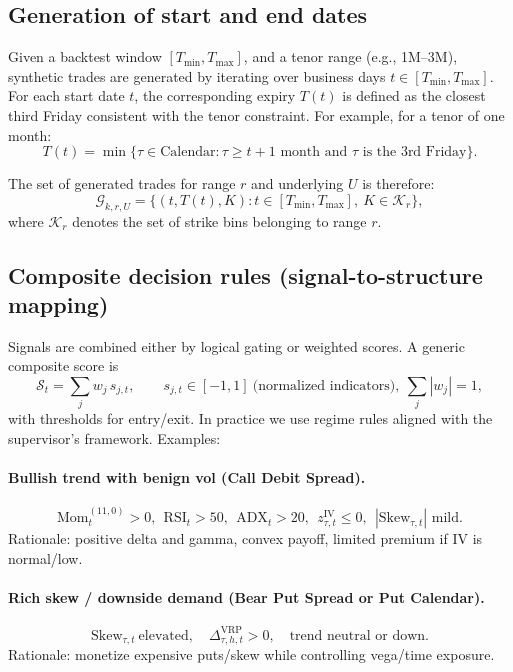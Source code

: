 \documentclass[12pt,a4paper]{report}
\begin{document}
\subsection{Generation of start and end dates}

Given a backtest window \([T_{\min}, T_{\max}]\), and a tenor range (e.g., 1M–3M), synthetic trades are generated by iterating over business days \(t \in [T_{\min}, T_{\max}]\). For each start date \(t\), the corresponding expiry \(T(t)\) is defined as the closest third Friday consistent with the tenor constraint. For example, for a tenor of one month:
\[
    T(t) = \min \{ \tau \in \text{Calendar} : \tau \geq t + 1 \text{ month and } \tau \text{ is the 3rd Friday} \}.
\]

The set of generated trades for range \(r\) and underlying \(U\) is therefore:
\[
    \mathcal{G}_{k,r,U} = \{ (t, T(t), K) : t \in [T_{\min}, T_{\max}], \ K \in \mathcal{K}_{r} \},
\]
where \(\mathcal{K}_{r}\) denotes the set of strike bins belonging to range \(r\).


\subsection{Composite decision rules (signal-to-structure mapping)}
Signals are combined either by logical gating or weighted scores. A generic composite score is
\[
\mathcal{S}_t=\sum_{j} w_j\, s_{j,t},\qquad s_{j,t}\in[-1,1]\ \text{(normalized indicators)},\ \sum_j |w_j|=1,
\]
with thresholds for entry/exit. In practice we use regime rules aligned with the supervisor’s framework. Examples:

\paragraph{Bullish trend with benign vol (Call Debit Spread).}
\[
\text{Mom}^{(11,0)}_t>0,\ \ \text{RSI}_t>50,\ \ \text{ADX}_t>20,\ \ z^{\text{IV}}_{\tau,t}\le 0,\ \ |\text{Skew}_{\tau,t}|\text{ mild}.
\]
Rationale: positive delta and gamma, convex payoff, limited premium if IV is normal/low.

\paragraph{Rich skew / downside demand (Bear Put Spread or Put Calendar).}
\[
\text{Skew}_{\tau,t}\ \text{elevated},\quad \Delta^{\text{VRP}}_{\tau,h,t}>0,\quad \text{trend\ neutral or down}.
\]
Rationale: monetize expensive puts/skew while controlling vega/time exposure.
\end{document}
